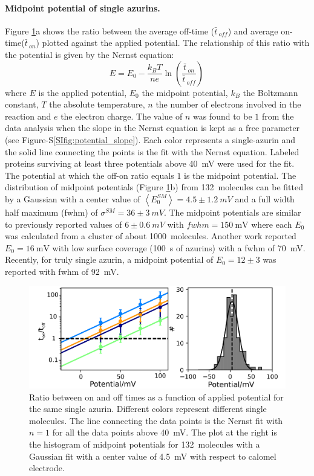\documentclass[journal=jacsat,manuscript=article]{achemso}
\newcommand*\me[1]{\ensuremath{\bar{#1}\,}}
\begin{document}
\paragraph*{Midpoint potential of single azurins.}
Figure \ref{fig:midpoint}a shows the ratio between the average off-time ($\me{t}_{off}$) and average on-time($\me{t}_{on}$) plotted against the applied potential.
The relationship of this ratio with the potential is given by the Nernst equation: 
\begin{equation}
	E = E_0 - \frac{k_BT}{n e}\ln\left(\frac{\me{t}_{on}}{\me{t}_{off}}\right)\,
	\label{eq:nernst}
\end{equation}
where $E$ is the applied potential, $E_0$ the midpoint potential, $k_B$ the Boltzmann constant, $T$ the absolute temperature, $n$ the number of electrons involved in the reaction and $e$ the electron charge.
The value of $n$ was found to be $1$ from the data analysis when the slope in the Nernst equation is kept as a free parameter (see Figure-S\ref{SIfig:potential_slope}).
Each color represents a single-azurin and the solid line connecting the points is the fit with the Nernst equation.
Labeled proteins surviving at least three potentials above \SI{40}{\mV} were used for the fit.
The potential at which the off-on ratio equals $1$ is the midpoint potential.
The distribution of midpoint potentials (Figure \ref{fig:midpoint}b) from \SI{132}{ molecules} can be fitted by a Gaussian with a center value of $\left<E_0^{SM}\right>=4.5 \pm 1.2~mV$ and a full width half maximum (fwhm) of $\sigma^{SM}=36 \pm 3~mV$. 
The midpoint potentials are similar to previously reported values of $6\pm0.6~mV$ with $fwhm=\SI{150}{\mV}$ where each $E_0$ was calculated from a cluster of about \SI{1000}{ molecules}.\cite{davis2006monitoring}
Another work reported $E_0 = \SI{16}{\mV}$ with low surface coverage (\SI{100}{\s} of azurins) with a fwhm of \SI{70}{\mV}.\cite{salverda2010fluorescent} 
Recently, for truly single azurin, a midpoint potential of $E_0=12\pm3$ was reported with fwhm of \SI{92}{\mV}.\cite{akkilic2014chemically-induced}\\
\begin{figure}
	\centering
	\includegraphics[]{Figure_2_midpoint}
	\caption{Ratio between on and off times as a function of applied potential for the same single azurin.
	Different colors represent different single molecules.
	The line connecting the data points is the Nernst fit with $n=1$ for all the data points above \SI{40}{\mV}.
	The plot at the right is the histogram of midpoint potentials for \SI{132}{ molecules} with a Gaussian fit with a center value of \SI{4.5}{\mV} with respect to calomel electrode.}
	\label{fig:midpoint}
\end{figure}
\end{document}
